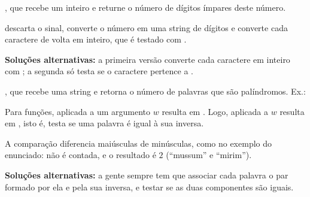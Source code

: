 {{\begin{Qlist}
\begin{solution}
        \end{solution}

        \item[(c)] , que recebe um inteiro e 
            returne o número de dígitos ímpares deste número.


        \begin{solution}
         descarta o sinal,  converte o número em uma string
        de dígitos e  converte cada caractere de volta em inteiro, que é
        testado com .


        \textbf{Soluções alternativas:} a primeira versão converte cada caractere em inteiro com ; a segunda só testa se o caractere pertence a .

        \end{solution}

        \item[(d)] , que recebe uma string e retorna
            o número de palavras que são palíndromos. Ex.:


        \begin{solution}
        Para funções,  aplicada a um argumento $w$ resulta em
        . Logo,  aplicada a $w$ resulta em
        , isto é, testa se uma palavra é igual à sua inversa.

        A comparação diferencia maiúsculas de minúsculas, como no exemplo do enunciado:
         não é contada, e o resultado é $2$ (``mussum'' e ``mirim'').


        \textbf{Soluções alternativas:} a gente sempre tem que associar cada palavra o par formado por ela e pela sua inversa, e testar se as duas componentes são iguais. 
        

\end{solution}
\end{Qlist}}}
